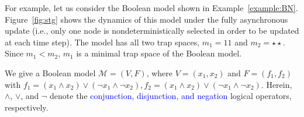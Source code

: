 \documentclass[runningheads]{llncs}
\newcommand{\revise}[1]{\textcolor{blue}{#1}}
\begin{document}
For example, let us consider the Boolean model shown in Example~\ref{example:BN}.
Figure~\ref{fig:stg} shows the dynamics of this model under the fully asynchronous update (i.e., only one node is nondeterministically selected in order to be updated at each time step).
The model has all two trap spaces, \(m_1 = 11\) and \(m_2 = \star\star\).
Since \(m_1 < m_2\), \(m_1\) is a minimal trap space of the Boolean model.

\begin{example}
We give a Boolean model \(\mathcal{M} = (V, F)\), where \(V = (x_1, x_2)\) and \(F = (f_1, f_2)\) with \(f_1 = (x_1 \land x_2) \lor (\neg x_1 \land \neg x_2), f_2 = (x_1 \land x_2) \lor (\neg x_1 \land \neg x_2)\). Herein, \(\land\), \(\lor\), and \(\neg\) denote the \revise{conjunction, disjunction, and negation} logical operators, respectively.\label{example:BN}
\end{example}
\end{document}
